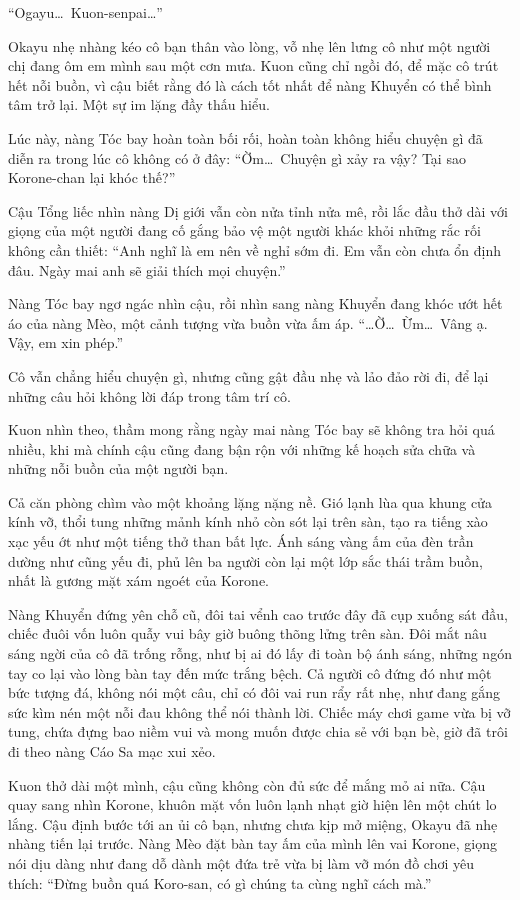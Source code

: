 \documentclass[../main.tex]{subfiles}
\begin{document}
``Ogayu\dots\ Kuon-senpai\dots''

Okayu nhẹ nhàng kéo cô bạn thân vào lòng, vỗ nhẹ lên lưng cô như một người chị đang ôm em mình sau một cơn mưa. Kuon cũng chỉ ngồi đó, để mặc cô trút hết nỗi buồn, vì cậu biết rằng đó là cách tốt nhất để nàng Khuyển có thể bình tâm trở lại. Một sự im lặng đầy thấu hiểu.

Lúc này, nàng Tóc bay hoàn toàn bối rối, hoàn toàn không hiểu chuyện gì đã diễn ra trong lúc cô không có ở đây: ``Ờm\dots\ Chuyện gì xảy ra vậy? Tại sao Korone-chan lại khóc thế?''

Cậu Tổng liếc nhìn nàng Dị giới vẫn còn nửa tỉnh nửa mê, rồi lắc đầu thở dài với giọng của một người đang cố gắng bảo vệ một người khác khỏi những rắc rối không cần thiết: ``Anh nghĩ là em nên về nghỉ sớm đi. Em vẫn còn chưa ổn định đâu. Ngày mai anh sẽ giải thích mọi chuyện.''

Nàng Tóc bay ngơ ngác nhìn cậu, rồi nhìn sang nàng Khuyển đang khóc ướt hết áo của nàng Mèo, một cảnh tượng vừa buồn vừa ấm áp. ``\dots Ờ\dots\ Ừm\dots\ Vâng ạ. Vậy, em xin phép.''

Cô vẫn chẳng hiểu chuyện gì, nhưng cũng gật đầu nhẹ và lảo đảo rời đi, để lại những câu hỏi không lời đáp trong tâm trí cô.

Kuon nhìn theo, thầm mong rằng ngày mai nàng Tóc bay sẽ không tra hỏi quá nhiều, khi mà chính cậu cũng đang bận rộn với những kế hoạch sửa chữa và những nỗi buồn của một người bạn.

Cả căn phòng chìm vào một khoảng lặng nặng nề. Gió lạnh lùa qua khung cửa kính vỡ, thổi tung những mảnh kính nhỏ còn sót lại trên sàn, tạo ra tiếng xào xạc yếu ớt như một tiếng thở than bất lực. Ánh sáng vàng ấm của đèn trần dường như cũng yếu đi, phủ lên ba người còn lại một lớp sắc thái trầm buồn, nhất là gương mặt xám ngoét của Korone.

Nàng Khuyển đứng yên chỗ cũ, đôi tai vểnh cao trước đây đã cụp xuống sát đầu, chiếc đuôi vốn luôn quẫy vui bây giờ buông thõng lửng trên sàn. Đôi mắt nâu sáng ngời của cô đã trống rỗng, như bị ai đó lấy đi toàn bộ ánh sáng, những ngón tay co lại vào lòng bàn tay đến mức trắng bệch. Cả người cô đứng đó như một bức tượng đá, không nói một câu, chỉ có đôi vai run rẩy rất nhẹ, như đang gắng sức kìm nén một nỗi đau không thể nói thành lời. Chiếc máy chơi game vừa bị vỡ tung, chứa đựng bao niềm vui và mong muốn được chia sẻ với bạn bè, giờ đã trôi đi theo nàng Cáo Sa mạc xui xẻo.

Kuon thở dài một mình, cậu cũng không còn đủ sức để mắng mỏ ai nữa. Cậu quay sang nhìn Korone, khuôn mặt vốn luôn lạnh nhạt giờ hiện lên một chút lo lắng. Cậu định bước tới an ủi cô bạn, nhưng chưa kịp mở miệng, Okayu đã nhẹ nhàng tiến lại trước. Nàng Mèo đặt bàn tay ấm của mình lên vai Korone, giọng nói dịu dàng như đang dỗ dành một đứa trẻ vừa bị làm vỡ món đồ chơi yêu thích: ``Đừng buồn quá Koro-san, có gì chúng ta cùng nghĩ cách mà.''
\end{document}

